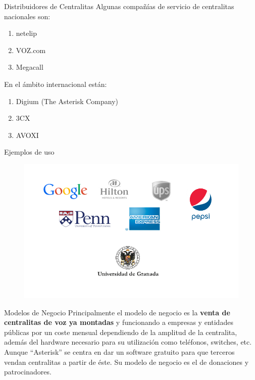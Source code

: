 \documentclass[11pt]{beamer}
\begin{document}
\begin{frame}{Distribuidores de Centralitas}
Algunas compañías de servicio de centralitas nacionales son:
\begin{enumerate}
\item netelip
\item VOZ.com
\item Megacall
\end{enumerate}
\vspace*{1cm}
En el ámbito internacional están:
\begin{enumerate}
\item Digium (The Asterisk Company)
\item 3CX
\item AVOXI
\end{enumerate}

\end{frame}


\begin{frame}{Ejemplos de uso}
\begin{figure}[H] %
\centering
\includegraphics[scale=0.4]{./imagenes/logos.png}
\end{figure}

\end{frame}


\begin{frame}{Modelos de Negocio}
Principalmente el modelo de negocio es la \textbf{venta de centralitas de voz 
ya montadas} y funcionando a empresas y entidades públicas por un coste 
mensual dependiendo de la amplitud de la centralita, además del hardware
necesario para su utilización como teléfonos, switches, etc.
\\
\vspace*{1cm}
Aunque ``Asterisk'' se centra en dar un software gratuito para que terceros vendan centralitas a partir de éste. Su modelo de negocio es el de donaciones y patrocinadores.
\end{frame}
\end{document}
